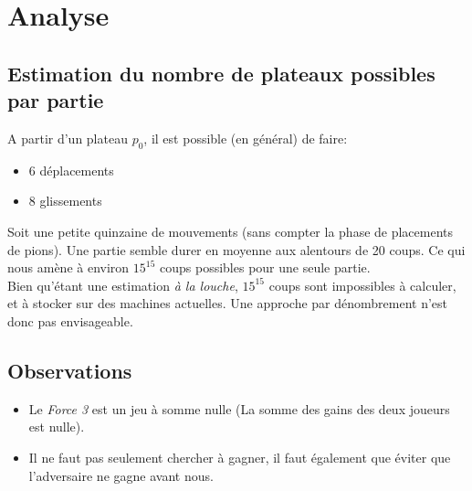 \documentclass[a4paper,12pt]{article}
\begin{document}
\section{Analyse}
\subsection{Estimation du nombre de plateaux possibles par partie}
A partir d'un plateau $p_0$, il est possible (en général) de faire:
\begin{itemize}
	\item 6 déplacements
	\item 8 glissements
\end{itemize}

Soit une petite quinzaine de mouvements (sans compter la phase de placements de pions). Une partie semble durer en moyenne aux alentours de 20 coups. Ce qui nous amène à environ $15^{15}$ coups possibles pour une seule partie.\\

Bien qu'étant une estimation \emph{à la louche}, $15^{15}$ coups sont impossibles à calculer, et à stocker sur des machines actuelles. Une approche par dénombrement n'est donc pas envisageable.

\subsection{Observations}
\begin{itemize}
	\item Le \emph{Force 3} est un jeu à somme nulle (La somme des gains des deux joueurs est nulle).
	\item Il ne faut pas seulement chercher à gagner, il faut également que éviter que l'adversaire ne gagne avant nous.
\end{itemize}

\newpage
\end{document}
